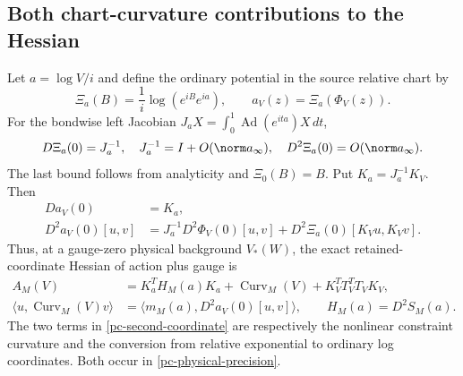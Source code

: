 \subsection{Both chart-curvature contributions to the Hessian}
\label{pc-hessian-section}

Let $a=\log V/i$ and define the ordinary potential in the
source relative chart by
\begin{equation}\label{pc-ordinary-coordinates}
 \Xi_a(B)=\frac1i\log(e^{iB}e^{ia}),\qquad
 a_V(z)=\Xi_a(\Phi_V(z)).
\end{equation}
For the bondwise left Jacobian
$J_aX=\int_0^1\operatorname{Ad}(e^{ita})X\,dt$,
\begin{equation}\label{pc-log-jacobian}
 D\Xi_a(0)=J_a^{-1},\quad
 J_a^{-1}=I+O(\norm a_\infty),\quad D^2\Xi_a(0)=O(\norm a_\infty).
\end{equation}
The last bound follows from analyticity and $\Xi_0(B)=B$.
Put $K_a=J_a^{-1}K_V$. Then
\begin{equation}\label{pc-second-coordinate}
 \begin{split}
 Da_V(0)&=K_a,\\
 D^2a_V(0)[u,v]&=J_a^{-1}D^2\Phi_V(0)[u,v]
                 +D^2\Xi_a(0)[K_Vu,K_Vv].
 \end{split}
\end{equation}
Thus, at a gauge-zero physical background $V_*(W)$, the exact
retained-coordinate Hessian of action plus gauge is
\begin{equation}\label{pc-physical-precision}
 \begin{split}
 A_M(V)&=K_a^TH_M(a)K_a+\operatorname{Curv}_M(V)
                  +K_V^TT_V^TT_VK_V,\\
 \langle u,\operatorname{Curv}_M(V)v\rangle
      &=\langle m_M(a),D^2a_V(0)[u,v]\rangle,\qquad
 H_M(a)=D^2S_M(a).
 \end{split}
\end{equation}
The two terms in \eqref{pc-second-coordinate} are respectively
the nonlinear constraint curvature and the conversion from
relative exponential to ordinary log coordinates. Both occur
in \eqref{pc-physical-precision}.


